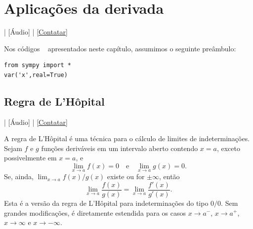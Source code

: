 
\chapter{Aplicações da derivada}\label{cap_apderiv}
\thispagestyle{fancy}

\begin{flushright}
  [Vídeo] | [Áudio] | \href{https://phkonzen.github.io/notas/contato.html}{[Contatar]}
\end{flushright}

\ifispython
\begin{obs}\label{obs:cap_apderiv_python}
  Nos códigos \sympy~ apresentados neste capítulo, assumimos o seguinte preâmbulo:
\begin{verbatim}
from sympy import *
var('x',real=True)
\end{verbatim}
\end{obs}
\fi

\section{Regra de L'Hôpital}\label{cap_apderiv_sec_lhospital}

\begin{flushright}
  [Vídeo] | [Áudio] | \href{https://phkonzen.github.io/notas/contato.html}{[Contatar]}
\end{flushright}

A regra de L'Hôpital é uma técnica para o cálculo de limites de indeterminações. Sejam $f$ e $g$ funções deriváveis em um intervalo aberto contendo $x=a$, exceto possivelmente em $x=a$, e
\begin{equation}
  \lim_{x\to a} f(x) = 0\quad\text{e}\quad\lim_{x\to a} g(x) = 0.
\end{equation}
Se, ainda, $\lim_{x\to a} f(x)/g(x)$ existe ou for $\pm\infty$, então
\begin{equation}
  \lim_{x\to a} \frac{f(x)}{g(x)} = \lim_{x\to a} \frac{f'(x)}{g'(x)}.
\end{equation}
Esta é a versão da regra de L'Hôpital para indeterminações do tipo $0/0$. Sem grandes modificações, é diretamente estendida para os casos $x\to a^-$, $x\to a^+$, $x\to \infty$ e $x\to -\infty$.

